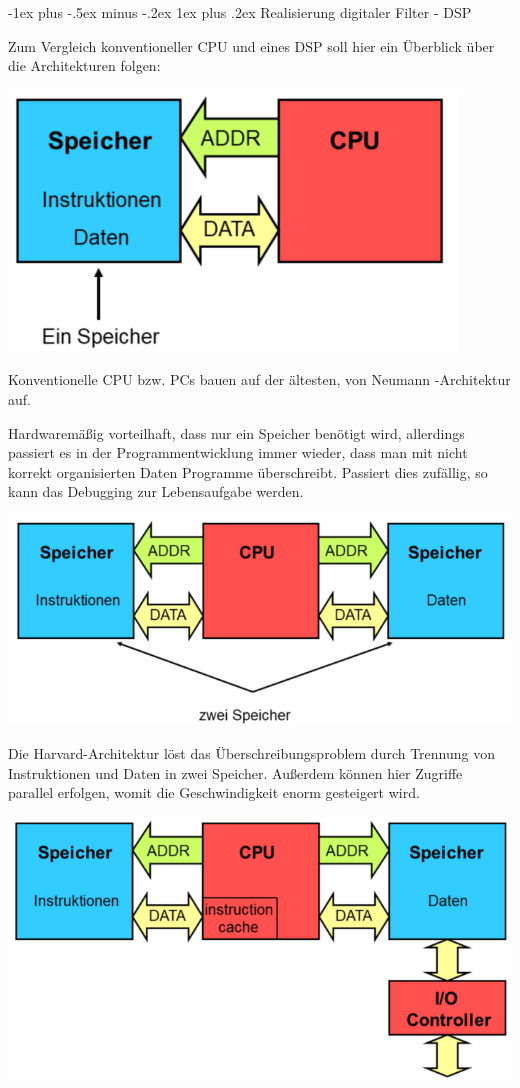 \documentclass[a4paper]{article}
\makeatletter
\renewcommand{\subsubsection}{\@startsection{subsubsection}{3}{0mm}%
 {-1ex plus -.5ex minus -.2ex}%
 {1ex plus .2ex}%
 {\normalfont\small\bfseries}}
\makeatother
\begin{document}
\begin{multicols}{3}
  \subsubsection{Realisierung digitaler Filter - DSP}\label{realisierung-digitaler-filter---dsp}

  Zum Vergleich konventioneller CPU und eines DSP soll hier ein Überblick
  über die Architekturen folgen:

  \begin{itemize*}
    \item \includegraphics[width=.5\linewidth]{Assets/Biosignalverarbeitung-von-neumann.png}
    \begin{itemize*}
      \item Konventionelle CPU bzw. PCs bauen auf der ältesten, von Neumann -Architektur auf.
      \item Hardwaremäßig vorteilhaft, dass nur ein Speicher benötigt wird, allerdings passiert es in der Programmentwicklung immer wieder, dass man mit nicht korrekt organisierten Daten Programme überschreibt. Passiert dies zufällig, so kann das Debugging zur Lebensaufgabe werden.
    \end{itemize*}
    \item \includegraphics[width=.5\linewidth]{Assets/Biosignalverarbeitung-harvard.png}
    \begin{itemize*}
      \item Die Harvard-Architektur löst das Überschreibungsproblem durch Trennung von Instruktionen und Daten in zwei Speicher. Außerdem können hier Zugriffe parallel erfolgen, womit die Geschwindigkeit enorm gesteigert wird.
    \end{itemize*}
    \item \includegraphics[width=.5\linewidth]{Assets/Biosignalverarbeitung-super-harvard.png}

\end{itemize*}
\end{multicols}
\end{document}
